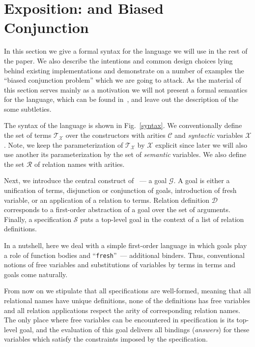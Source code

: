 \section{Exposition: \mk and Biased Conjunction}
\label{sec:exposition}

In this section we give a formal syntax for the language we will use in the rest of the paper. We also describe the intentions and common design
choices lying behind existing implementations and demonstrate on a number of examples the ``biased conjunction problem'' which we are going to attack.
As the material of this section serves mainly as a motivation we will not present a formal semantics for the language, which can be found in~\cite{fair:semantics},
and leave out the description of the some subtleties.

The syntax of the language is shown in Fig.~\ref{syntax}. We conventionally define the set of terms $\mathcal{T}_\mathcal{X}$
over the constructors with arities $\mathcal{C}$ and \emph{syntactic} variables $\mathcal{X}$. Note, we keep the parameterization of $\mathcal{T}_\mathcal{X}$ by $\mathcal{X}$
explicit since later we will also use another its parameterization by the set of \emph{semantic} variables. We also define the set $\mathcal{R}$ of relation names with arities.

Next, we introduce the central construct of \mk~--- a goal $\mathcal{G}$. A goal is either a unification of terms, disjunction or conjunction of goals, introduction of fresh variable,
or an application of a relation to terms. Relation definition $\mathcal{D}$ corresponds to a first-order abstraction of a goal over the set of arguments. Finally, a specification $\mathcal{S}$
puts a top-level goal in the context of a list of relation definitions.

In a nutshell, here we deal with a simple first-order language in which goals play a role of function bodies and ``\lstinline|fresh|''~--- additional binders. Thus,
conventional notions of free variables and substitutions of variables by terms in terms and goals come naturally.

From now on we stipulate that all specifications are well-formed, meaning that all relational names have unique definitions, none of the definitions has
free variables and all relation applications respect the arity of corresponding relation names. The only place where free variables can be encountered in specification
is its top-level goal, and the evaluation of this goal delivers all bindings (\emph{answers}) for these variables which satisfy the constraints imposed by the specification.

